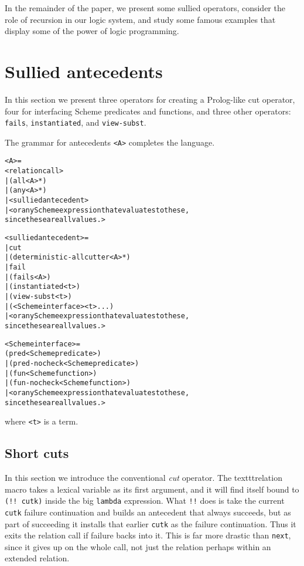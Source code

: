 In the remainder of the paper, we present some sullied operators,
consider the role of recursion in our logic system, and study some
famous examples that display some of the power of logic programming.

\section{Sullied antecedents}

In this section we present three operators for creating a
Prolog-like cut operator, four for interfacing Scheme predicates and
functions, and three other operators: \texttt{fails}, \texttt{instantiated},
and \texttt{view-subst}.

The grammar for antecedents \texttt{<A>} completes the language.
\begin{alltt}
<A> = 
     <relation call> 
   | (all <A>*)
   | (any <A>*) 
   | <sullied antecedent>
   | <or any Scheme expression that evaluates to these,
       since these are all values.>

<sullied antecedent> = 
   | cut
   | (deterministic-all cutter <A>*)
   | fail
   | (fails <A>)
   | (instantiated <t>)
   | (view-subst <t>)
   | (<Scheme interface> <t> ...)
   | <or any Scheme expression that evaluates to these,
       since these are all values.>

<Scheme interface> = 
     (pred <Scheme predicate>)
   | (pred-nocheck <Scheme predicate>)
   | (fun <Scheme function>)
   | (fun-nocheck <Scheme function>)
   | <or any Scheme expression that evaluates to these,
       since these are all values.>

\end{alltt}

\noindent
where \texttt{<t>} is a term.

\subsection{Short cuts}

In this section we introduce the conventional \emph{cut} operator.
The texttt{relation} macro takes a lexical variable as its first
argument, and it will find itself bound to \texttt{(!! cutk)} inside
the big \texttt{lambda} expression.  What \texttt{!!} does is take the
current \texttt{cutk} failure continuation and builds an antecedent
that always succeeds, but as part of succeeding it installs that
earlier \texttt{cutk} as the failure continuation.  Thus it exits the
relation call if failure backs into it.  This is far more drastic
than \texttt{next}, since it gives up on the whole call, not just the
relation perhaps within an extended relation.

